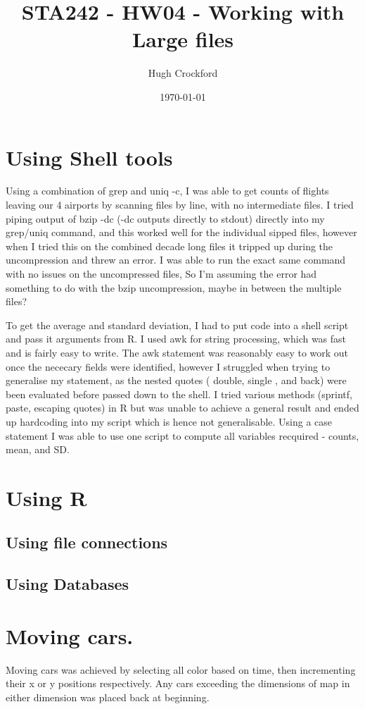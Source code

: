 \documentclass[12pt]{article}
\title{STA242 - HW04 - Working with Large files}
\author{Hugh Crockford}
\date{\today}
\begin{document}
	\maketitle
	\section{Using Shell tools}
		Using a combination of grep and uniq -c, I was able to get counts of flights leaving our 4 airports by scanning files by line, with no intermediate files. 
		I tried piping output of bzip -dc (-dc outputs directly to stdout) directly into my grep/uniq command, and this worked well for the individual sipped files, however when I tried this on the combined decade long files it tripped up during the uncompression and threw an error. I was able to run the exact same command with no issues on the uncompressed files, So I'm assuming the error had something to do with the bzip uncompression, maybe in between the multiple files?
		

		To get the average and standard deviation, I had to put code into a shell script and pass it arguments from R.
		I used awk for string processing, which was fast and is fairly easy to write.
		The awk statement was reasonably easy to work out once the nececary fields were identified, however I struggled when trying to generalise my statement, as the nested quotes ( double, single , and back) were  been evaluated before passed down to the shell.
		I tried various methods (sprintf, paste, escaping quotes) in R but was unable to achieve a general result and ended up hardcoding into my script which is hence not generalisable.
		Using a case statement I was able to use one script to compute all variables recquired - counts, mean, and SD.

	\section{Using R}
		\subsection{Using file connections}
			

		\subsection{Using Databases}

	\section{Moving cars.}
		Moving cars was achieved by selecting all color based on time, then incrementing their x or y positions respectively. Any cars exceeding the dimensions of map in either dimension was placed back at beginning. 
\end{document}

